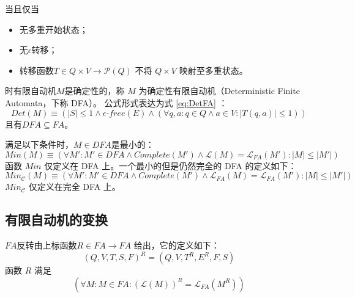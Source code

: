 \begin{definition}
    当且仅当 
    \begin{itemize}
        \item 无多重开始状态；
        \item 无$\epsilon$转移；
        \item 转移函数$T \in Q \times V \longrightarrow \mathcal{P} (Q) $ 不将 $Q \times V$ 映射至多重状态。
    \end{itemize}
    时有限自动机$M$是确定性的，称 $M$ 为确定性有限自动机（Deterministic Finite Automata，下称 DFA）。
    公式形式表达为式 \ref{eq:DetFA} ：
    \begin{equation}\label{eq:DetFA}
    Det(M) \equiv ( |S| \leq 1 \land \epsilon\mbox{-} free(E) \land ( \forall q,a:q \in Q \land a \in V : |T(q,a)| \leq 1 )) 
    \end{equation}
    且有$ DFA \subseteq FA$。
\end{definition}


\begin{definition}
    满足以下条件时，$M\in DFA$是最小的：
    { \small \[  Min(M) \equiv (\forall M' : M' \in DFA \land Complete(M') \land \mathcal{L}(M) = \mathcal{L}_{FA}(M') : |M| \leq |M'| ) \] }
函数 $Min$ 仅定义在 DFA 上。一个最小的但是仍然完全的 DFA 的定义如下：
{\small \[  Min_{\mathcal{C}}(M) \equiv ( \forall M':M' \in DFA \land Complete(M') \land \mathcal{L}_{FA}(M) = \mathcal{L}_{FA}(M'): |M| \leq |M'| ) \] }
$Min_{\mathcal{C}}$ 仅定义在完全 DFA 上。
\end{definition}

\subsection{有限自动机的变换}

\begin{transformation}
        $FA$反转由上标函数$ R \in FA \to FA $ 给出，它的定义如下：
        \[ (Q,V,T,S,F)^R = (Q,V,T^R,E^R,F,S) \]
    函数 $R$ 满足
    \[ (\forall M : M \in FA : ( \mathcal{L} (M) )^R = \mathcal{L}_{FA}(M^R)) \]
\end{transformation}

